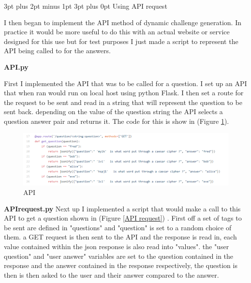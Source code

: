 \documentclass[12pt,a4paper]{article}
\makeatletter
\renewcommand\subsection{\@startsection {subsection}{1}{2mm} %
                               {3pt plus 2pt minus 1pt} %
                               {3pt plus 0pt} %
                               {\normalfont\bfseries}}
\makeatother
\begin{document}
\subsection{Using API request}   

I then began to implement the API method of dynamic challenge generation. In practice it would be more useful to do this with an actual website or service designed for this use but for test purposes I just made a script to represent the API being called to for the answers.  

\textbf{API.py}    

First I implemented the API that was to be called for a question. I set up an API that when ran would run on local host using python Flask. I then set a route for the request to be sent and read in a string that will represent the question to be sent back. depending on the value of the question string the API selects a question answer pair and returns it. The code for this is show in (Figure \ref{API}).


\begin{figure}[h]
    \centering
    \includegraphics[width=1.0\textwidth]{Figs/API.PNG} 
    \caption{API} 
    \label{API}
\end{figure}

\textbf{API\textunderscore request.py} 
Next up I implemented a script that would make a call to this API to get a question shown in (Figure \ref{API request}) . First off a set of tags to be sent are defined in "questions" and "question" is set to a random choice of them. a GET request is then sent to the API and the response is read in, each value contained within the json response is also read into "values". the "user question" and "user answer" variables are set to the question contained in the response and the answer contained in the response respectively, the question is then is then asked to the user and their answer compared to the answer. 
\end{document}
